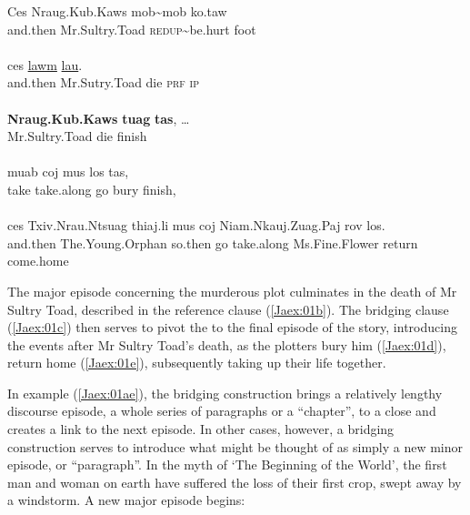 \documentclass[output=paper]{LSP/langsci}
\begin{document}
\begin{exe}
\ex \label{Jaex:01ae}
\begin{xlist}
\ex \label{Jaex:01a}
\gll Ces Nraug.Kub.Kaws mob{\textasciitilde}mob ko.taw\\
and.then Mr.Sultry.Toad \textsc{redup}{\textasciitilde}be.hurt foot\\
\glt {}\\
\ex \label{Jaex:01b}
\gll ces \underline{} \underline{} \underline{lawm} \underline{lau}.\\
and.then Mr.Sutry.Toad die \textsc{prf} \textsc{ip}\\ 
\glt {}\\
\ex \label{Jaex:01c}
\gll \textbf{Nraug.Kub.Kaws} \textbf{tuag} \textbf{tas}, …\\		
Mr.Sultry.Toad die finish \\ 
\glt {}\\
\ex \label{Jaex:01d}
\gll muab coj mus los tas, \\		           
take take.along go bury finish,\\
\glt {}\\
\ex \label{Jaex:01e}
\gll ces Txiv.Nrau.Ntsuag thiaj.li mus coj Niam.Nkauj.Zuag.Paj rov los.\\     	      
and.then The.Young.Orphan so.then go take.along Ms.Fine.Flower return come.home\\
\glt {} \citep[][140]{johnson92}
\end{xlist}
\end{exe}

\noindent
The major episode concerning the murderous plot culminates in the death of Mr Sultry Toad, described in the reference clause (\ref{Jaex:01b}). The bridging clause (\ref{Jaex:01c}) then serves to pivot the  to the final episode of the story, introducing the events after Mr Sultry Toad’s death, as the plotters bury him (\ref{Jaex:01d}), return home (\ref{Jaex:01e}), subsequently taking up their life together. 
 
In example (\ref{Jaex:01ae}), the bridging construction brings a relatively lengthy discourse episode, a whole series of paragraphs or a ``chapter'', to a close and creates a link to the next episode. In other cases, however, a bridging construction serves to introduce what might be thought of as simply a new minor episode, or ``paragraph''. In the myth of `The Beginning of the World', the first man and woman on earth have suffered the loss of their first crop, swept away by a windstorm. A new major episode begins:
\end{document}
